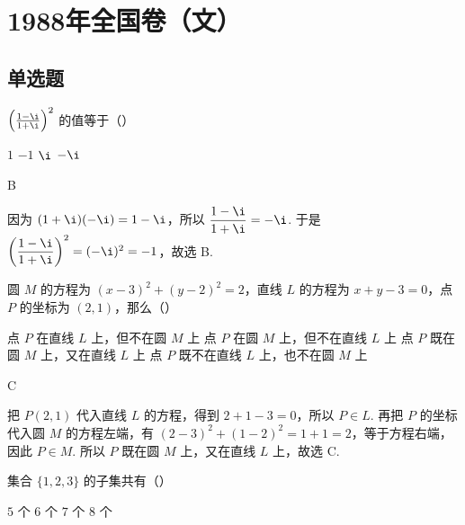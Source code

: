 \chapter{1988年全国卷（文）}

\section{单选题}

\begin{problem}
\(\left(\frac{1-\i}{1+\i}\right)^2\) 的值等于（\quad）

\choices
    {\(1\)}
    {\(-1\)}
    {\(\i\)}
    {\(-\i\)}
\end{problem}

\begin{answer}
B
\end{answer}

\begin{solution}
因为 \((1+\i)(-\i)=1-\i\)，所以
\(\dfrac{1-\i}{1+\i}=-\i\). 于是
\(\left(\dfrac{1-\i}{1+\i}\right)^2=(-\i)^2=-1\)，故选 B.
\end{solution}


\begin{problem}
圆 \(M\) 的方程为 \(\left(x-3\right)^2 + \left(y-2\right)^2 = 2\)，直线 \(L\) 的方程为 \(x+y-3 = 0\)，点 \(P\) 的坐标为 \((2,1)\)，那么（\quad）

\choices
    {点 \(P\) 在直线 \(L\) 上，但不在圆 \(M\) 上}
    {点 \(P\) 在圆 \(M\) 上，但不在直线 \(L\) 上}
    {点 \(P\) 既在圆 \(M\) 上，又在直线 \(L\) 上}
    {点 \(P\) 既不在直线 \(L\) 上，也不在圆 \(M\) 上}
\end{problem}

\begin{answer}
C
\end{answer}

\begin{solution}
把 \(P\left(2,1\right)\) 代入直线 \(L\) 的方程，得到
\(2+1-3=0\)，所以 \(P\in L\). 再把 \(P\) 的坐标代入圆 \(M\) 的方程左端，有
\(\left(2-3\right)^2+\left(1-2\right)^2=1+1=2\)，等于方程右端，因此 \(P\in M\). 所以 \(P\) 既在圆 \(M\) 上，又在直线 \(L\) 上，故选 C.
\end{solution}

\begin{problem}
集合 \(\{1,2,3\}\) 的子集共有（\quad）

\choices
    {\(5\) 个}
    {\(6\) 个}
    {\(7\) 个}
    {\(8\) 个}
\end{problem}

